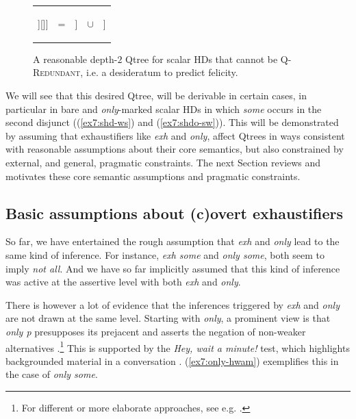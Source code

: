 \begin{figure}[H]
	\centering
	\begin{tabular}{ccccc}
		\begin{forest}
			[CS[$\neg\forall$[$\neg\exists$][\fbox{$\exists\wedge\neg\forall$}]][\fbox{$\forall$}]]
		\end{forest}
		&
		=
		&
		\begin{forest}
			[CS[$\neg\forall$][\fbox{$\forall$}]]
		\end{forest}
		&
		$\cup$
		&
		\begin{forest}
			[{CS$\cap\neg\forall$} [$\neg\exists$][\fbox{$\exists\wedge\neg\forall$}]]
		\end{forest}
	\end{tabular}
	\caption{A reasonable depth-$2$ Qtree for scalar HDs that cannot be \textsc{Q-Redundant}, i.e. a desideratum to predict felicity.}\label{fig7:qtree-desideratum}
\end{figure}

We will see that this desired Qtree, will be derivable in certain cases, in particular in bare and \textit{only}-marked scalar HDs in which \textit{some} occurs in the second disjunct ((\ref{ex7:shd-ws}) and (\ref{ex7:shdo-sw})). This will be demonstrated by assuming that exhaustifiers like \textit{exh} and \textit{only}, affect Qtrees in ways consistent with reasonable assumptions about their core semantics, but also constrained by external, and general, pragmatic constraints. The next Section reviews and motivates these core semantic assumptions and pragmatic constraints.

\subsection{Basic assumptions about (c)overt exhaustifiers}\label{sec7:exh-presupp-assumptions}

So far, we have entertained the rough assumption that \textit{exh} and \textit{only} lead to the same kind of inference. For instance, \textit{exh some} and \textit{only some}, both seem to imply \textit{not all}. And we have so far implicitly assumed that this kind of inference was active at the assertive level with both \textit{exh} and \textit{only}.

There is however a lot of evidence that the inferences triggered by \textit{exh} and \textit{only} are not drawn at the same level. Starting with \textit{only}, a prominent view is that \textit{only p} presupposes its prejacent and asserts the negation of non-weaker alternatives \parencite{Horn1972,Horn1996,Rooth1985,Rooth1992,Roberts2006,Alxatib2013}.\footnote{For different or more elaborate approaches, see e.g. \textcite{Atlas1993,Horn2002,Roberts2011,Crnic2024}.} This is supported by the \textit{Hey, wait a minute!} test, which highlights backgrounded material in a conversation \parencite{vonFintel2004,Shannon1976}. (\ref{ex7:only-hwam}) exemplifies this in the case of \textit{only some}. 

